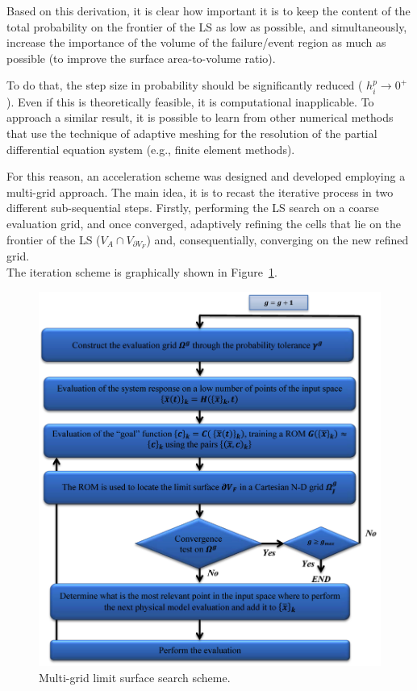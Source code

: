 Based on this derivation, it is clear how important it is to keep the 
content of the total probability on the frontier of the LS as low as 
possible, and simultaneously, increase the importance of the volume of 
the failure/event region as much as possible (to improve the surface 
area-to-volume ratio).

To do that, the step size in probability should be significantly 
reduced ( $h_{i}^{p} \rightarrow 0^{+}$). Even if this is theoretically 
feasible, it is computational inapplicable. To approach a similar result, it 
is possible to learn from other numerical methods that use the 
technique of adaptive meshing for the resolution of the partial 
differential equation system (e.g., finite element methods).

For this reason, an acceleration scheme was designed and developed 
employing a multi-grid approach. The main idea, it is to recast the 
iterative process in two different sub-sequential steps. Firstly, 
performing the LS search on a coarse evaluation grid, and once 
converged, adaptively refining the cells that lie on the frontier of the LS 
($V_{A} \cap V_{\partial V_{F}}$) and, consequentially, converging on 
the new refined grid.
\\The iteration scheme is graphically shown in 
Figure~\ref{fig:LimitSurfaceMultiGridAlgoFlow}.
\begin{figure}[h!]
  \centering
  \includegraphics[width=1.0\textwidth]  {pics/LimitSurfaceMultiGridAlgoFlow.png}
  \caption{Multi-grid limit surface search scheme.}
  \label{fig:LimitSurfaceMultiGridAlgoFlow}
\end{figure}
